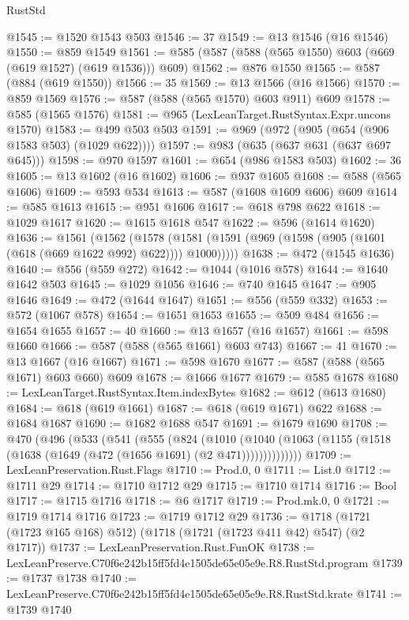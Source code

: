 \begin{lexlean}{RustStd}
\begin{coremodule}
@1545 := @1520 @1543 @503
@1546 := 37
@1549 := @13 @1546 (@16 @1546)
@1550 := @859 @1549
@1561 := @585 (@587 (@588 (@565 @1550) @603 (@669 (@619 @1527) (@619 @1536))) @609)
@1562 := @876 @1550
@1565 := @587 (@884 (@619 @1550))
@1566 := 35
@1569 := @13 @1566 (@16 @1566)
@1570 := @859 @1569
@1576 := @587 (@588 (@565 @1570) @603 @911) @609
@1578 := @585 (@1565 @1576)
@1581 := @965 (LexLeanTarget.RustSyntax.Expr.uncons @1570)
@1583 := @499 @503 @503
@1591 := @969 (@972 (@905 (@654 (@906 @1583 @503) (@1029 @622))))
@1597 := @983 (@635 (@637 @631 (@637 @697 @645)))
@1598 := @970 @1597
@1601 := @654 (@986 @1583 @503)
@1602 := 36
@1605 := @13 @1602 (@16 @1602)
@1606 := @937 @1605
@1608 := @588 (@565 @1606)
@1609 := @593 @534
@1613 := @587 (@1608 @1609 @606) @609
@1614 := @585 @1613
@1615 := @951 @1606
@1617 := @618 @798 @622
@1618 := @1029 @1617
@1620 := @1615 @1618 @547
@1622 := @596 (@1614 @1620)
@1636 := @1561
    (@1562
      (@1578 (@1581 (@1591 (@969 (@1598 (@905 (@1601 (@618 (@669 @1622 @992) @622)))) @1000)))))
@1638 := @472 (@1545 @1636)
@1640 := @556 (@559 @272)
@1642 := @1044 (@1016 @578)
@1644 := @1640 @1642 @503
@1645 := @1029 @1056
@1646 := @740 @1645
@1647 := @905 @1646
@1649 := @472 (@1644 @1647)
@1651 := @556 (@559 @332)
@1653 := @572 (@1067 @578)
@1654 := @1651 @1653
@1655 := @509 @484
@1656 := @1654 @1655
@1657 := 40
@1660 := @13 @1657 (@16 @1657)
@1661 := @598 @1660
@1666 := @587 (@588 (@565 @1661) @603 @743)
@1667 := 41
@1670 := @13 @1667 (@16 @1667)
@1671 := @598 @1670
@1677 := @587 (@588 (@565 @1671) @603 @660) @609
@1678 := @1666 @1677
@1679 := @585 @1678
@1680 := LexLeanTarget.RustSyntax.Item.indexBytes
@1682 := @612 (@613 @1680)
@1684 := @618 (@619 @1661)
@1687 := @618 (@619 @1671) @622
@1688 := @1684 @1687
@1690 := @1682 @1688 @547
@1691 := @1679 @1690
@1708 := @470
    (@496
      (@533
        (@541
          (@555
            (@824
              (@1010
                (@1040 (@1063 (@1155 (@1518 (@1638 (@1649 (@472 (@1656 @1691) (@2 @471))))))))))))))
@1709 := LexLeanPreservation.Rust.Flags
@1710 := Prod.{0, 0}
@1711 := List.{0}
@1712 := @1711 @29
@1714 := @1710 @1712 @29
@1715 := @1710 @1714
@1716 := Bool
@1717 := @1715 @1716
@1718 := @6 @1717
@1719 := Prod.mk.{0, 0}
@1721 := @1719 @1714 @1716
@1723 := @1719 @1712 @29
@1736 := @1718 (@1721 (@1723 @165 @168) @512) (@1718 (@1721 (@1723 @411 @42) @547) (@2 @1717))
@1737 := LexLeanPreservation.Rust.FunOK
@1738 := LexLeanPreserve.C70f6e242b15ff5fd4e1505de65e05e9e.R8.RustStd.program
@1739 := @1737 @1738
@1740 := LexLeanPreserve.C70f6e242b15ff5fd4e1505de65e05e9e.R8.RustStd.krate
@1741 := @1739 @1740

\end{coremodule}
\end{lexlean}
